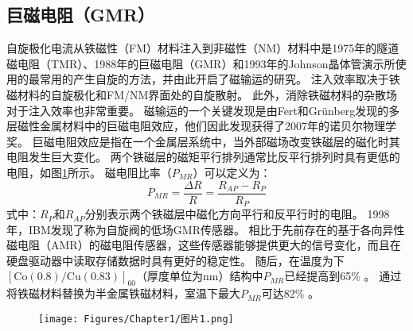 \subsection{巨磁电阻（GMR）}
自旋极化电流从铁磁性（FM）材料注入到非磁性（NM）材料中是1975年的隧道磁电阻（TMR）、1988年的巨磁电阻（GMR）和1993年的Johnson晶体管演示所使用的最常用的产生自旋的方法，并由此开启了磁输运的研究\cite{julliere1975tunneling,baibich1988giant,binasch1989enhanced,johnson1991analysis}。
注入效率取决于铁磁材料的自旋极化和FM/NM界面处的自旋散射。
此外，消除铁磁材料的杂散场对于注入效率也非常重要。
磁输运的一个关键发现是由Fert\cite{baibich1988giant}和Grünberg\cite{binasch1989enhanced}发现的多层磁性金属材料中的巨磁电阻效应，他们因此发现获得了2007年的诺贝尔物理学奖。
巨磁电阻效应是指在一个金属层系统中，当外部磁场改变铁磁层的磁化时其电阻发生巨大变化\cite{ennen2016giant}。
两个铁磁层的磁矩平行排列通常比反平行排列时具有更低的电阻，如图\ref{图1.1}所示。
磁电阻比率（$P_{MR}$）可以定义为：
\begin{equation}
    P_{MR} = \frac{\Delta R}{R} = \frac{R_{AP}-R_P}{R_P}
    \label{公式1-1}
\end{equation}
式中：$R_P$和$R_{AP}$分别表示两个铁磁层中磁化方向平行和反平行时的电阻。
1998年，IBM发现了称为自旋阀的低场GMR传感器。
相比于先前存在的基于各向异性磁电阻（AMR）的磁电阻传感器，这些传感器能够提供更大的信号变化，而且在硬盘驱动器中读取存储数据时具有更好的稳定性。
随后，在温度为下$\mathrm{[Co(0.8)/Cu(0.83)]_{60}}$（厚度单位为nm）结构中$P_{MR}$已经提高到65\% \cite{ikeda2008tunnel}。
通过将铁磁材料替换为半金属铁磁材料，室温下最大$P_{MR}$可达82\% \cite{parkin1991giant}。
\begin{figure}[h]
    \centering
    \texttt{[image: Figures/Chapter1/图片1.png]}
    \label{图1.1}
\end{figure}
